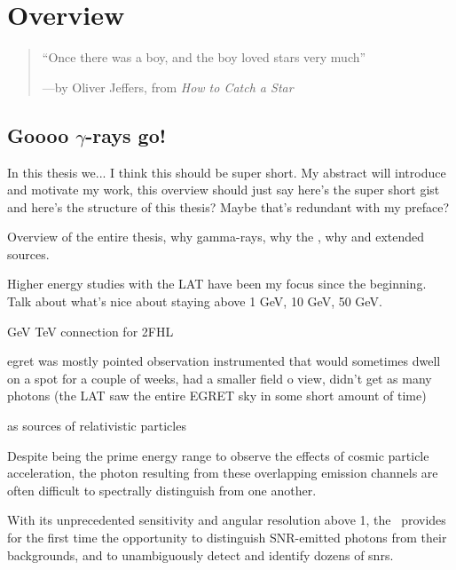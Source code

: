 \chapter{Overview}
\label{chap:intro}

\begin{quote}
	``Once there was a boy, and the boy loved stars very much'' 
	\begin{center}---by Oliver Jeffers, from \it{How to Catch a Star} \end{center}
\end{quote}

\section{Goooo $\gamma$-rays go!}
In this thesis we...
I think this should be super short. My abstract will introduce and motivate my work, this overview should just say here's the super short gist and here's the structure of this thesis? Maybe that's redundant with my preface?

Overview of the entire thesis, why gamma-rays, why the \lat{}, why \snrs{} and extended sources.

Higher energy studies with the LAT have been my focus since the beginning. Talk about what's nice about staying above 1 GeV, 10 GeV, 50 GeV. 

GeV TeV connection for 2FHL


egret was mostly pointed observation instrumented that would sometimes dwell on a spot for a couple of weeks, had a smaller field o view, didn't get as many photons (the LAT saw the entire EGRET sky in some short amount of time)

\snrs{} as sources of relativistic particles

Despite being the prime energy range to observe the effects of cosmic particle acceleration, the photon \sed{} resulting from these overlapping emission channels are often difficult to spectrally distinguish from one another.


With its unprecedented sensitivity and angular resolution above 1\gev, the \lat~provides for the first time the opportunity to distinguish SNR-emitted photons from their backgrounds, and  to unambiguously detect and identify dozens of \glspl{snr}. 

